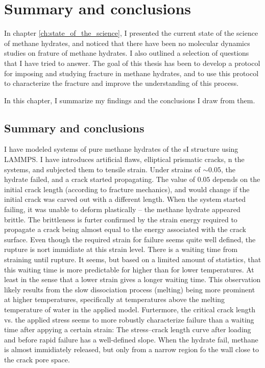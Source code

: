 \chapter{Summary and conclusions}
\label{ch:summary_conclusions}
In chapter \ref{ch:state_of_the_science}, I presented the current state of the science of methane hydrates, and noticed that there have been no molecular dynamics studies on frature of methane hydrates. I also outlined a selection of questions that I have tried to answer. The goal of this thesis has been to develop a protocol for imposing and studying fracture in methane hydrates, and to use this protocol to characterize the fracture and improve the understanding of this process. 

In this chapter, I summarize my findings and the conclusions I draw from them.

\section{Summary and conclusions}

I have modeled systems of pure methane hydrates of the sI structure using LAMMPS. I have introduces artificial flaws, elliptical prismatic cracks, n the systems, and subjected them to tensile strain. Under strains of $\sim 0.05$, the hydrate failed, and a crack started propagating. The value of $0.05$ depends on the initial crack length (according to fracture mechanics), and would change if the initial crack was carved out with a different length. When the system started failing, it was unable to deform plastically -- the methane hydrate appeared brittle. The brittleness is furter confirmed by the strain energy required to propagate a crack being almost equal to the energy associated with the crack surface. 
%
Even though the required strain for failure seems quite well defined, the rupture is nort immidiate at this strain level. There is a waiting time from straining until rupture. It seems, but based on a limited amount of statistics, that this waiting time is more predictable for higher than for lower temperatures. At least in the sense that a lower strain gives a longer waiting time. This observation likely results from the slow dissociation process (melting) being more prominent at higher temperatures, specifically at temperatures above the melting temperature of water in the applied model.  Furtermore, the critical crack length vs. the applied stress seems to more robustly characterize failure than a waiting time after appying a certain strain: The stress--crack length curve after loading and before rapid failure has a well-defined slope. 
% 
When the hydrate fail, methane is almost immidiately released, but only from a narrow region fo the wall close to the crack pore space. 


